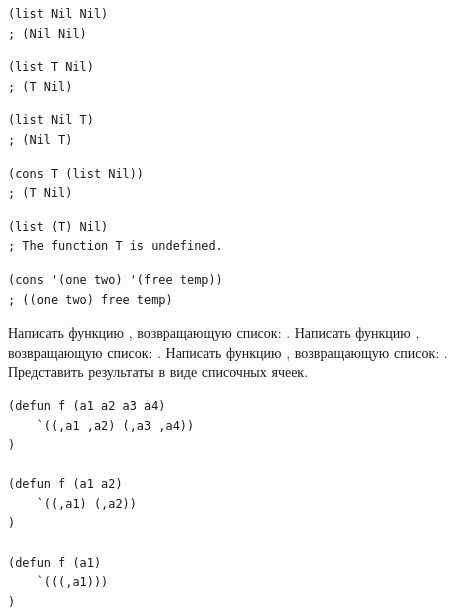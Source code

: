\documentclass[a4paper]{report}
\begin{document}
\begin{task}
\begin{AutoMultiColEnumerate}
		\item
\begin{lstlisting}[style=lispinline]
(list Nil Nil)
; (Nil Nil)
\end{lstlisting}

		\item
\begin{lstlisting}[style=lispinline]
(list T Nil)
; (T Nil)
\end{lstlisting}

		\item
\begin{lstlisting}[style=lispinline]
(list Nil T)
; (Nil T)
\end{lstlisting}

		\item
\begin{lstlisting}[style=lispinline]
(cons T (list Nil))
; (T Nil)
\end{lstlisting}

		\item
\begin{lstlisting}[style=lispinline]
(list (T) Nil)
; The function T is undefined.
\end{lstlisting}

		\item
\begin{lstlisting}[style=lispinline]
(cons '(one two) '(free temp))
; ((one two) free temp)
\end{lstlisting}

	\end{AutoMultiColEnumerate}
\end{task}

\begin{task}
	Написать функцию , возвращающую список: .
	Написать функцию , возвращающую список: .
	Написать функцию , возвращающую список: .
	Представить результаты в виде списочных ячеек.
\end{task}

\begin{lstlisting}[style=lispinline, frame=single]
(defun f (a1 a2 a3 a4)
	`((,a1 ,a2) (,a3 ,a4))
)

(defun f (a1 a2)
	`((,a1) (,a2))
)

(defun f (a1)
	`(((,a1)))
)
\end{lstlisting}
\end{document}
